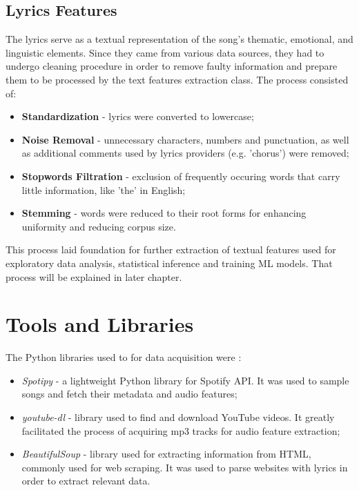 \subsection{Lyrics Features}
 The lyrics serve as a textual representation of the song's thematic,
 emotional, and linguistic elements. Since they came from various data sources,
 they had  to undergo cleaning procedure in order to remove faulty information
 and prepare them to be processed by the text features extraction class. The
 process consisted of:
 \begin{itemize}
  \item \textbf{Standardization} - lyrics were converted to lowercase;
  \item \textbf{Noise Removal} - unnecessary characters, numbers and
    punctuation, as well as additional comments used by lyrics providers (e.g.
    'chorus') were removed;
  \item \textbf{Stopwords Filtration} - exclusion of frequently occuring words
    that carry little information, like 'the' in English;
  \item \textbf{Stemming} - words were reduced to their root forms for enhancing
    uniformity and reducing corpus size.
 \end{itemize}

 This process laid foundation for further extraction of textual features used
 for exploratory data analysis, statistical inference and training ML models.
 That process will be explained in later chapter.



\section{Tools and Libraries}
\label{sec:toolsandlibrariesused}
The Python libraries used to for data acquisition were \cite{spotipy, ytdl, beautifulsoup}:
\begin{itemize}
  \item \textit{Spotipy} - a lightweight Python library for Spotify API. It was
    used to sample songs and fetch their metadata and audio features;
  \item \textit{youtube-dl}  - library used to find and download YouTube
    videos. It greatly facilitated the process of acquiring mp3 tracks for
    audio feature extraction;
  \item \textit{BeautifulSoup}  - library used for extracting information from
    HTML, commonly used for web scraping. It was used to parse websites with
    lyrics in order to extract relevant data.
\end{itemize}


